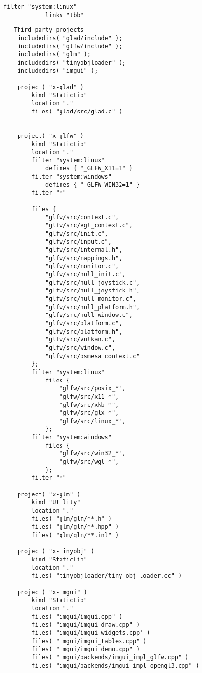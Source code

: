 \begin{appendices}
\begin{lstlisting}[caption = Premake Script for solution generation]
    	filter "system:linux"
    		links "tbb"
\end{lstlisting}

\clearpage

\begin{lstlisting}[caption=Premake Script for external library]
    -- Third party projects
    includedirs( "glad/include" );
    includedirs( "glfw/include" );
    includedirs( "glm" );
    includedirs( "tinyobjloader" );
    includedirs( "imgui" );
    
    project( "x-glad" )
    	kind "StaticLib"
    	location "."
    	files( "glad/src/glad.c" )
    
    
    project( "x-glfw" )
    	kind "StaticLib"
    	location "."
    	filter "system:linux"
    		defines { "_GLFW_X11=1" }
    	filter "system:windows"
    		defines { "_GLFW_WIN32=1" }
    	filter "*"
    
    	files {
    		"glfw/src/context.c",
    		"glfw/src/egl_context.c",
    		"glfw/src/init.c",
    		"glfw/src/input.c",
    		"glfw/src/internal.h",
    		"glfw/src/mappings.h",
    		"glfw/src/monitor.c",
    		"glfw/src/null_init.c",
    		"glfw/src/null_joystick.c",
    		"glfw/src/null_joystick.h",
    		"glfw/src/null_monitor.c",
    		"glfw/src/null_platform.h",
    		"glfw/src/null_window.c",
    		"glfw/src/platform.c",
    		"glfw/src/platform.h",
    		"glfw/src/vulkan.c",
    		"glfw/src/window.c",
    		"glfw/src/osmesa_context.c"
    	};
    	filter "system:linux"
    		files {
    			"glfw/src/posix_*",
    			"glfw/src/x11_*", 
    			"glfw/src/xkb_*",
    			"glfw/src/glx_*",
    			"glfw/src/linux_*",
    		};
    	filter "system:windows"
    		files {
    			"glfw/src/win32_*",
    			"glfw/src/wgl_*", 
    		};
    	filter "*"
    
    project( "x-glm" )
    	kind "Utility"
    	location "."
    	files( "glm/glm/**.h" )
    	files( "glm/glm/**.hpp" )
    	files( "glm/glm/**.inl" )
    
    project( "x-tinyobj" )
    	kind "StaticLib"
    	location "."
    	files( "tinyobjloader/tiny_obj_loader.cc" )
    
    project( "x-imgui" )
    	kind "StaticLib"
    	location "."
    	files( "imgui/imgui.cpp" )
    	files( "imgui/imgui_draw.cpp" )
    	files( "imgui/imgui_widgets.cpp" )
    	files( "imgui/imgui_tables.cpp" )
    	files( "imgui/imgui_demo.cpp" )
    	files( "imgui/backends/imgui_impl_glfw.cpp" )
    	files( "imgui/backends/imgui_impl_opengl3.cpp" )
\end{lstlisting}


\end{appendices}
